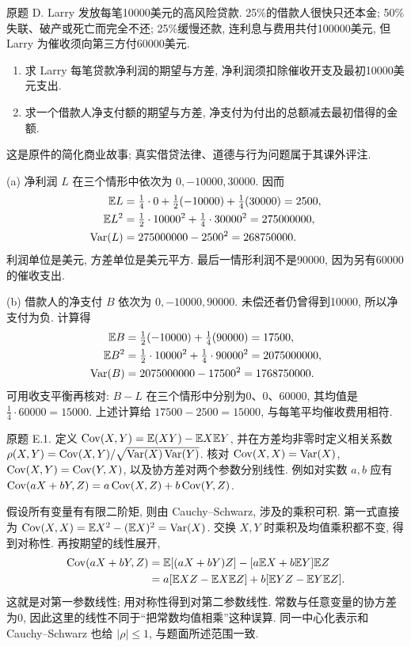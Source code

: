 \begin{exercise}\label{ps4-d}
原题 D. Larry 发放每笔10000美元的高风险贷款. 25\%的借款人很快只还本金; 50\%失联、破产或死亡而完全不还; 25\%缓慢还款, 连利息与费用共付100000美元, 但 Larry 为催收须向第三方付60000美元.
\begin{enumerate}[label=(\alph*)]
\item 求 Larry 每笔贷款净利润的期望与方差, 净利润须扣除催收开支及最初10000美元支出.
\item 求一个借款人净支付额的期望与方差, 净支付为付出的总额减去最初借得的金额.
\end{enumerate}
这是原件的简化商业故事; 真实借贷法律、道德与行为问题属于其课外评注.
\end{exercise}
\begin{solution}
(a) 净利润 $L$ 在三个情形中依次为 $0,-10000,30000$. 因而
\begin{align*}
\mathbb E L&=\tfrac14\cdot0+\tfrac12(-10000)+\tfrac14(30000)=2500,\\
\mathbb E L^2&=\tfrac12\cdot10000^2+\tfrac14\cdot30000^2=275000000,\\
\operatorname{Var}(L)&=275000000-2500^2=268750000.
\end{align*}
利润单位是美元, 方差单位是美元平方. 最后一情形利润不是90000, 因为另有60000的催收支出.

(b) 借款人的净支付 $B$ 依次为 $0,-10000,90000$. 未偿还者仍曾得到10000, 所以净支付为负. 计算得
\begin{align*}
\mathbb E B&=\tfrac12(-10000)+\tfrac14(90000)=17500,\\
\mathbb E B^2&=\tfrac12\cdot10000^2+\tfrac14\cdot90000^2=2075000000,\\
\operatorname{Var}(B)&=2075000000-17500^2=1768750000.
\end{align*}
可用收支平衡再核对: $B-L$ 在三个情形中分别为0、0、60000, 其均值是 $\tfrac14\cdot60000=15000$. 上述计算给 $17500-2500=15000$, 与每笔平均催收费用相符.
\end{solution}

\begin{exercise}\label{ps4-e1}
原题 E.1. 定义 $\operatorname{Cov}(X,Y)=\mathbb E(XY)-\mathbb E X\mathbb E Y$, 并在方差均非零时定义相关系数
$\rho(X,Y)=\operatorname{Cov}(X,Y)/\sqrt{\operatorname{Var}(X)\operatorname{Var}(Y)}$.
核对 $\operatorname{Cov}(X,X)=\operatorname{Var}(X)$, $\operatorname{Cov}(X,Y)=\operatorname{Cov}(Y,X)$, 以及协方差对两个参数分别线性. 例如对实数 $a,b$ 应有 $\operatorname{Cov}(aX+bY,Z)=a\operatorname{Cov}(X,Z)+b\operatorname{Cov}(Y,Z)$.
\end{exercise}
\begin{solution}
假设所有变量有有限二阶矩, 则由 Cauchy--Schwarz, 涉及的乘积可积. 第一式直接为
$\operatorname{Cov}(X,X)=\mathbb E X^2-(\mathbb E X)^2=\operatorname{Var}(X)$.
交换 $X,Y$ 时乘积及均值乘积都不变, 得到对称性. 再按期望的线性展开,
\begin{align*}
\operatorname{Cov}(aX+bY,Z)
&=\mathbb E[(aX+bY)Z]-[a\mathbb E X+b\mathbb E Y]\mathbb E Z\\
&=a[\mathbb E XZ-\mathbb E X\mathbb E Z]+b[\mathbb E YZ-\mathbb E Y\mathbb E Z].
\end{align*}
这就是对第一参数线性; 用对称性得到对第二参数线性. 常数与任意变量的协方差为0, 因此这里的线性不同于“把常数均值相乘”这种误算. 同一中心化表示和 Cauchy--Schwarz 也给 $|\rho|\le1$, 与题面所述范围一致.
\end{solution}

